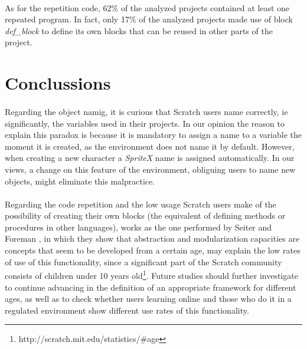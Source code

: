 \documentclass[a4paper,10pt]{article}
\begin{document}
\paragraph{}As for the repetition code, 62\% of the analyzed projects contained at least one repeated program. In fact, only 17\% of the analyzed projects made use of block \textit{def\_block} to define its own blocks that can be reused in other parts of the project. 

\section{Conclussions}

\paragraph{}Regarding the object namig, it is curious that Scratch users name correctly, ie significantly, the variables used in their projects. In our opinion the reason to explain this paradox is because it is mandatory to assign a name to a variable the moment it is created, as the environment does not name it by default. However, when creating a new character a  \textit{SpriteX} name is assigned automatically. In our views, a change on this feature of the environment, obliguing users to name new objects, might eliminate this malpractice.
\paragraph{}Regarding the code repetition and the low usage Scratch users make of the possibility of creating their own blocks (the equivalent of defining methods or procedures in other languages), works as the one performed by Seiter and Foreman \cite {seiter2013modeling}, in which they show that abstraction and modularization capacities are concepts that seem to be developed from a certain age, may explain the low rates of use of this functionality, since a significant part of the Scratch community consists of children under 10 years old\footnote{http://scratch.mit.edu/statistics/\#age}. Future studies should further investigate to continue advancing in the definition of an appropriate framework for different ages, as well as to check whether users learning online and those who do it in a regulated environment show different use rates of this functionality.

\newpage


\end{document}
